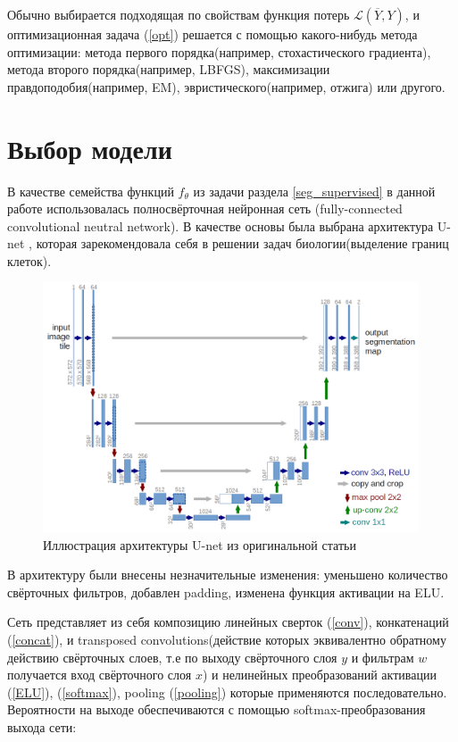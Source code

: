 \documentclass[14pt, a4paper, oneside, bold]{extarticle}
\begin{document}
Обычно выбирается подходящая по свойствам функция потерь $\mathcal{L}(\overline{Y}, Y)$, и оптимизационная задача (\ref{opt})
решается с помощью какого-нибудь метода оптимизации: метода первого порядка(например, стохастического градиента), метода второго порядка(например, LBFGS), максимизации правдоподобия(например, EM), эвристического(например, отжига) или другого.

\newpage


\section{Выбор модели} \label{seg_nn}

В качестве семейства функций $f_{\theta}$ из задачи раздела \ref{seg_supervised} в данной работе использовалась 
полносвёрточная нейронная сеть (fully-connected convolutional neutral network). В качестве основы была выбрана архитектура U-net \cite{6}, которая зарекомендовала себя в решении задач биологии(выделение границ клеток). 

\begin{figure}[h!] \label{unet_arch}
\includegraphics[width=0.99\textwidth]{data/images/u-net-architecture.png}
\caption{Иллюстрация архитектуры U-net из оригинальной статьи \cite{6}}
\end{figure}

В архитектуру \cite{6} были внесены незначительные изменения: уменьшено количество свёрточных фильтров, добавлен padding, изменена функция активации на ELU.

Сеть представляет из себя композицию линейных
сверток (\ref{conv}), конкатенаций (\ref{concat}), и transposed convolutions(действие которых эквивалентно обратному действию свёрточных слоев, т.е по выходу свёрточного слоя $y$ и фильтрам $w$ получается вход свёрточного слоя $x$) 
и нелинейных преобразований
активации (\ref{ELU}), (\ref{softmax}), pooling (\ref{pooling}) которые применяются последовательно. 
Вероятности на выходе обеспечиваются с помощью 
softmax-преобразования выхода сети: 
\end{document}
